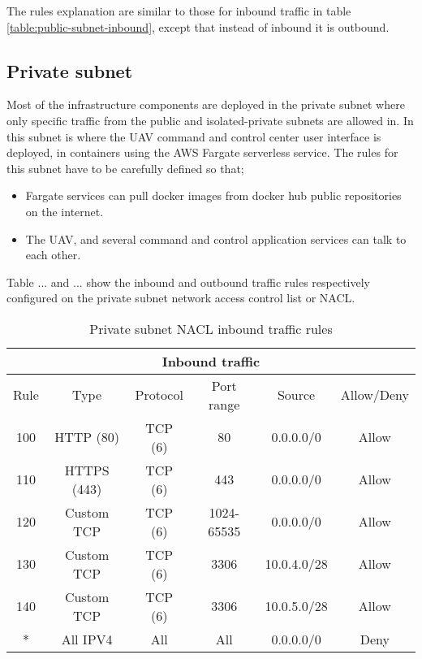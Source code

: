 The rules explanation are similar to those for inbound traffic in table \ref{table:public-subnet-inbound}, except that instead of inbound it is outbound.

\subsection{Private subnet}
\label{private-subnet}
Most of the infrastructure components are deployed in the private subnet where only specific traffic from the public and isolated-private subnets are allowed in. In this subnet is where the UAV command and control center user interface is deployed, in containers using the AWS Fargate serverless service. The rules for this subnet have to be carefully defined so that;

\begin{itemize}
    \item Fargate services can pull docker images from docker hub public repositories on the internet.
    \item The UAV, and several command and control application services can talk to each other.
\end{itemize}

Table ... and ... show the inbound and outbound traffic rules respectively configured on the private subnet network access control list or NACL.

\begin{table}[H]
    \centering
    \begin{tabular}{|c|c|c|c|c|c|}
        \hline
        \multicolumn{6}{|c|}{Inbound traffic}                                 \\
        \hline
        Rule & Type        & Protocol & Port range & Source      & Allow/Deny \\
        \hline
        100  & HTTP (80)   & TCP (6)  & 80         & 0.0.0.0/0   & Allow      \\
        \hline
        110  & HTTPS (443) & TCP (6)  & 443        & 0.0.0.0/0   & Allow      \\
        \hline
        120  & Custom TCP  & TCP (6)  & 1024-65535 & 0.0.0.0/0   & Allow      \\
        \hline
        130  & Custom TCP  & TCP (6)  & 3306       & 10.0.4.0/28 & Allow      \\
        \hline
        140  & Custom TCP  & TCP (6)  & 3306       & 10.0.5.0/28 & Allow      \\
        \hline
        *    & All IPV4    & All      & All        & 0.0.0.0/0   & Deny       \\
        \hline
    \end{tabular}
    \caption{Private subnet NACL inbound traffic rules}
    \label{table:private-subnet-inbound}
\end{table}

